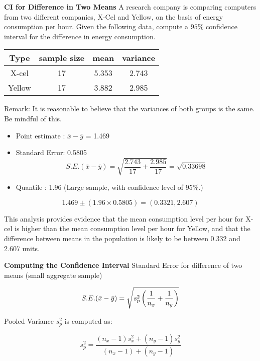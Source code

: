 \documentclass[a4paper,12pt]{article}
\begin{document}

\noindent \textbf{CI for Difference in Two Means}
A research company is comparing computers from two different companies, X-Cel and Yellow, on the basis of energy consumption per hour. Given the following data, compute a $95\%$ confidence interval for the difference in energy consumption.
\begin{center}
	\begin{tabular}{|c|c|c|c|}
		\hline
		Type & sample size & mean & variance \\ \hline
		X-cel & 17 & 5.353 & 2.743 \\ \hline
		Yellow & 17 & 3.882 & 2.985 \\ \hline
	\end{tabular}
\end{center}
Remark: It is reasonable to believe that the variances of both groups is the same. Be mindful of this.



\begin{itemize}
	\item Point estimate : $\bar{x} - \bar{y}$ = 1.469
	\item Standard Error: 0.5805
	\[ S.E.(\bar{x}-\bar{y}) = \sqrt{\frac{2.743}{17} + \frac{2.985}{17}} = \sqrt{0.33698} \]
	\item Quantile : 1.96 (Large sample, with confidence level of $95\%$.)
\end{itemize}

\[ 1.469  \pm (1.96 \times 0.5805) = (0.3321,2.607) \]


This analysis provides evidence that the mean consumption level per hour for X-cel is higher than the mean consumption level per hour for Yellow, and that the difference between means in the population is likely to be between 0.332 and 2.607 units.




\noindent \textbf{Computing the Confidence Interval}
Standard Error for difference of two means (small aggregate sample)

\[ S.E.(\bar{x}-\bar{y}) = \sqrt{  s^2_p \left({1\over n_x}+{1\over n_y} \right)} \]

Pooled Variance $s^2_p$ is computed as:

\[ s^2_p = \frac{(n_x-1)s^2_x + (n_y-1)s^2_y}{(n_x-1) + (n_y-1)} \]
\end{document}
